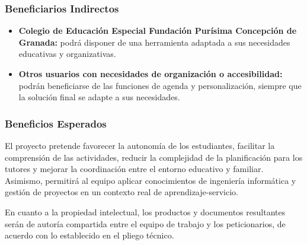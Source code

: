 \subsubsection{Beneficiarios Indirectos}
\begin{itemize}
    \item \textbf{Colegio de Educación Especial Fundación Purísima Concepción de Granada:} podrá disponer de una herramienta adaptada a sus necesidades educativas y organizativas.
    \item \textbf{Otros usuarios con necesidades de organización o accesibilidad:} podrán beneficiarse de las funciones de agenda y personalización, siempre que la solución final se adapte a sus necesidades.
\end{itemize}

\subsubsection{Beneficios Esperados}
El proyecto pretende favorecer la autonomía de los estudiantes, facilitar la comprensión de las actividades, reducir la complejidad de la planificación para los tutores y mejorar la coordinación entre el entorno educativo y familiar. Asimismo, permitirá al equipo aplicar conocimientos de ingeniería informática y gestión de proyectos en un contexto real de aprendizaje-servicio.

En cuanto a la propiedad intelectual, los productos y documentos resultantes serán de autoría compartida entre el equipo de trabajo y los peticionarios, de acuerdo con lo establecido en el pliego técnico.
